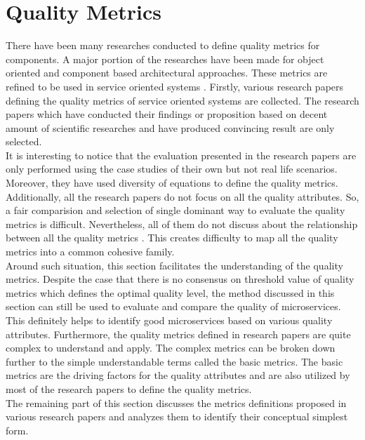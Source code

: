 \section{Quality Metrics}\label{section:quality_of_service/quality_metrics}
There have been many researches conducted to define quality metrics for components. A major portion of the researches have been made for object oriented and component based architectural approaches. These metrics are refined to be used in service oriented systems \cite{Xiao-jun:2015aa, Sindhgatta:2015aa}. Firstly, various research papers defining the quality metrics of service oriented systems are collected. The research papers which have conducted their findings or proposition based on decent amount of scientific researches and have produced convincing result are only selected.\\
It is interesting to notice that the evaluation presented in the research papers are only performed using the case studies of their own but not real life scenarios. Moreover, they have used diversity of equations to define the quality metrics. Additionally, all the research papers do not focus on all the quality attributes. So, a fair comparision and selection of single dominant way to evaluate the quality metrics is difficult. Nevertheless, all of them do not discuss about the relationship between all the quality metrics \cite{Elhag:2014aa}.  This creates difficulty to map all the quality metrics into a common cohesive family. 
\\
Around such situation, this section facilitates the understanding of the quality metrics. Despite the case that there is no consensus on threshold value of quality metrics which defines the optimal quality level, the method discussed in this section can still be used to evaluate and compare the quality of microservices. This definitely helps to identify good microservices based on various quality attributes. Furthermore, the quality metrics defined in research papers are quite complex to understand and apply. The complex metrics can be broken down further to the simple understandable terms called the  basic metrics. The basic metrics are the driving factors for the quality attributes and are also utilized by most of the research papers to define the quality metrics.
\\
The remaining part of this section discusses the metrics definitions proposed in various research papers and analyzes them to identify their conceptual simplest form.

